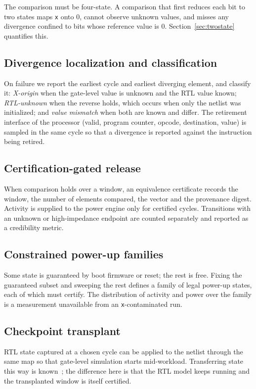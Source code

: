 \documentclass[journal]{IEEEtran}
\newcommand{\X}{\texttt{x}}
\begin{document}
The comparison must be four-state. A comparison that first reduces each bit to
two states maps \X{} onto 0, cannot observe unknown values, and misses any
divergence confined to bits whose reference value is 0. Section~\ref{sec:twostate}
quantifies this.

\subsection{Divergence localization and classification}
On failure we report the earliest cycle and earliest diverging element, and
classify it: \emph{X-origin} when the gate-level value is unknown and the RTL
value known; \emph{RTL-unknown} when the reverse holds, which occurs when only the
netlist was initialized; and \emph{value mismatch} when both are known and
differ. The retirement interface of the processor (valid, program counter, opcode,
destination, value) is sampled in the same cycle so that a divergence is reported
against the instruction being retired.

\subsection{Certification-gated release}
When comparison holds over a window, an equivalence certificate records the
window, the number of elements compared, the vector and the provenance digest.
Activity is supplied to the power engine only for certified cycles. Transitions
with an unknown or high-impedance endpoint are counted separately and reported as
a credibility metric.

\subsection{Constrained power-up families}
Some state is guaranteed by boot firmware or reset; the rest is free. Fixing the
guaranteed subset and sweeping the rest defines a family of legal power-up
states, each of which must certify. The distribution of activity and power over
the family is a measurement unavailable from an \X-contaminated run.

\subsection{Checkpoint transplant}
RTL state captured at a chosen cycle can be applied to the netlist through the
same map so that gate-level simulation starts mid-workload. Transferring state
this way is known~\cite{p10540462}; the difference here is that the RTL model
keeps running and the transplanted window is itself certified.
\end{document}
